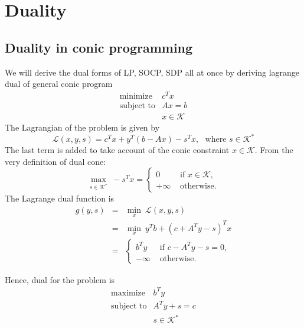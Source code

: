 \documentclass[10pt,oneside]{book}
\theoremstyle{definition}
\begin{document}
\section{Duality}


\subsection{Duality in conic programming}

We will derive the dual forms of LP, SOCP, SDP all at once by deriving lagrange dual of general conic program
\begin{equation}
\begin{array}{ll}
\mbox{minimize} & c^Tx\\
\mbox{subject to}& Ax = b\\
& x \in \mathcal{K}
\end{array} 
\end{equation}
The Lagrangian of the problem is given by 
\begin{equation}
\mathcal{L}(x,y,s) = c^Tx + y^T(b-Ax) - s^Tx, \ \ \ \mbox{where } s\in \mathcal{K}^*
\end{equation}
The last term is added to take account of the conic constraint $x\in \mathcal{K}$. From the very definition of dual cone:
\begin{equation}
\max_{s\in \mathcal{K}^*} \ -s^Tx = 
\left\lbrace \begin{array}{ll} 
0 & \mbox{ if } x\in\mathcal{K},\\ 
+\infty & \mbox{ otherwise.}
\end{array}\right. 
\end{equation}
The Lagrange dual function is 
\begin{eqnarray}
g(y,s) &=& \min_x \ \mathcal{L}(x,y,s) \\
&=& \min_x \ y^Tb + (c+A^Ty -s)^Tx \\
&=& \left\lbrace \begin{array}{ll} 
b^Ty & \mbox{ if } c-A^Ty - s = 0,\\ 
-\infty & \mbox{ otherwise.}
\end{array}\right. 
\end{eqnarray}

Hence, dual for the problem is 
\begin{equation}
 \begin{array}{ll}
\mbox{maximize} & b^Ty\\
\mbox{subject to}& A^Ty + s = c\\
& s \in \mathcal{K}^*
\end{array}
\end{equation}
\end{document}
